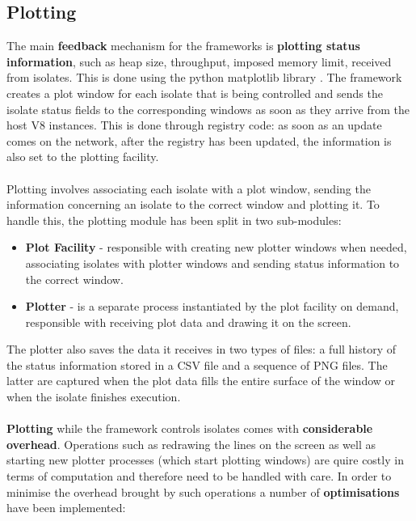 \documentclass{l4proj}
\begin{document}
\subsection{Plotting}
\hspace*{3em} The main \textbf{feedback} mechanism for the frameworks is \textbf{plotting status information}, such as heap size, throughput, imposed memory limit, received from isolates. This is done using the python matplotlib library \cite{matplotlib}. The framework creates a plot window for each isolate that is being controlled and sends the isolate status fields to the corresponding windows as soon as they arrive from the host V8 instances. This is done through registry code: as soon as an update comes on the network, after the registry has been updated, the information is also set to the plotting facility.
\\\\
\hspace*{3em} Plotting involves associating each isolate with a plot window, sending the information concerning an isolate to the correct window and plotting it. To handle this, the plotting module has been split in two sub-modules:
\begin{itemize}
\item \textbf{Plot Facility} - responsible with creating new plotter windows when needed, associating isolates with plotter windows and sending status information to the correct window. 
\item \textbf{Plotter} - is a separate process instantiated by the plot facility on demand, responsible with receiving plot data and drawing it on the screen.
\end{itemize}
\hspace*{3em} The plotter also saves the data it receives in two types of files: a full history of the status information stored in a CSV file and a sequence of PNG files. The latter are captured when the plot data fills the entire surface of the window or when the isolate finishes execution.
\\\\
\hspace*{3em} \textbf{Plotting} while the framework controls isolates comes with \textbf{considerable overhead}. Operations such as redrawing the lines on the screen as well as starting new plotter processes (which start plotting windows) are quire costly in terms of computation and therefore need to be handled with care. In order to minimise the overhead brought by such operations a number of \textbf{optimisations} have been implemented:
\end{document}
